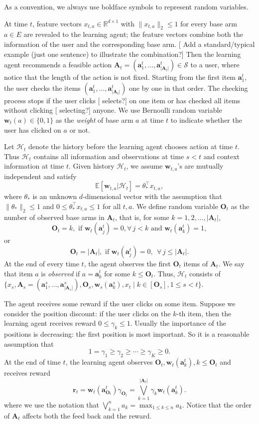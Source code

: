 \documentclass{article}
\newcommand{\EE}{\mathbb{E}}
\newcommand{\RR}{\mathbb{R}}
\newcommand{\bA}{\mathbf{A}}
\newcommand{\ba}{\mathbf{a}}
\newcommand{\bO}{\mathbf{O}}
\newcommand{\br}{\mathbf{r}}
\newcommand{\bw}{\mathbf{w}}
\newcommand{\cH}{\mathcal{H}}
\newcommand{\cS}{\mathcal{S}}
\newcommand{\abs}[1]{\left| #1 \right|}
\newcommand{\norm}[1]{\| #1 \|}
\newcommand{\shengyu}[1]{{\color{green!50!black} [\text{Shengyu:} #1]}}
\begin{document}
As a convention, we always use boldface symbols to represent random variables.

At time $t$, feature vectors $x_{t,a} \in \RR^{d \times 1}$ with $\norm{x_{t,a}}_2 \leq 1$ for every base arm $a \in E$ are revealed to the learning agent; the feature vectors combine both the information of the user and the corresponding base arm. \shengyu{Add a standard/typical example (just one sentence) to illustrate the combination?} Then the learning agent recommends a feasible action $\bA_t=(\ba_{1}^t,...,\ba_{\abs{\bA_t}}^t) \in \cS$ to a user, where notice that the length of the action is not fixed. 
Starting from the first item $\ba_{1}^t$, the user checks the items $(\ba_{1}^t,...,\ba_{\abs{\bA_t}}^t)$ one by one in that order. The checking process stops if the user clicks \shengyu{selects?} on one item or has checked all items without clicking \shengyu{selecting?} anyone. We use Bernoulli random variable $\bw_{t}(a) \in \{0,1\}$ as the {\em weight} of base arm $a$ at time $t$ to indicate whether the user has clicked on $a$ or not. 

Let $\cH_t$ denote the history before the learning agent chooses action at time $t$.
Thus $\cH_t$ contains all information and observations at time $s < t$ and context information at time $t$. Given history $\cH_t$, we assume $\bw_{t,a}$'s are mutually independent and satisfy
\begin{equation}
\label{eq:expectation}
\EE[\bw_{t,a} | \cH_t] = \theta_{\ast}^{\top} x_{t,a},
\end{equation}
where $\theta_{\ast}$ is an unknown $d$-dimensional vector with the assumption that $\norm{\theta_{\ast}}_2 \leq 1$ and $0 \leq \theta_{\ast}^{\top} x_{t,a} \leq 1$ for all $t, a$. 
We define random variable $\bO_t$ as the number of observed base arms in $\bA_t$, that is,
	for some $k=1,2,\ldots, \abs{\bA_t}$, 
$$
\bO_t = k, \text{ if } \bw_t(\ba_j^t)=0, \forall\, j < k \text{ and } \bw_t(\ba_k^t) = 1,
$$
or 
$$
\bO_t = \abs{\bA_t}, \text{ if }\bw_t(\ba_j^t) = 0, ~~ \forall\, j \leq \abs{\bA_t}.
$$
At the end of every time $t$, the agent observes the first $\bO_t$ items of $\bA_t$. We say that item $a$ is {\it observed} if $a = \ba_k^t$ for some $k \leq \bO_t$. 
Thus, $\cH_t$ consists of $\{x_s, \bA_s = (\ba_{1}^s,...,\ba_{\abs{\bA_s}}^s), \bO_s, \bw_s(\ba_k^s),x_t 
	\mid  k \in[\bO_s], 1 \le s<t \}$.

The agent receives some reward if the user clicks on some item. Suppose we consider the position discount: if the user clicks on the $k$-th item, then the learning agent receives reward $0 \leq \gamma_k \leq 1$. Usually the importance of the positions is decreasing: the first position is most important. So it is a reasonable assumption that
$$
1 = \gamma_1 \geq \gamma_2 \geq \cdots \geq \gamma_K \geq 0.
$$
At the end of time $t$, the learning agent observes $\bO_t, \bw_t(\ba_k^t), k \leq \bO_t$ and receives reward
$$
\br_t = \bw_t(\ba_{\bO_t}^t) \gamma_{\bO_t} = \bigvee_{k=1}^{\abs{\bA_t}} \gamma_k \bw_t(\ba_k^t).
$$
where we use the notation that $\bigvee_{k=1}^n a_k = \max_{1 \leq k \leq n} a_k$. Notice that the order of $\bA_t$ affects both the feed back and the reward.
\end{document}
